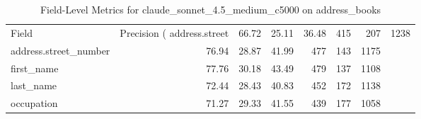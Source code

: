 \begin{table}
\caption{Field-Level Metrics for claude_sonnet_4.5_medium_c5000 on address_books}
\label{tab:fields_claude_sonnet_4.5_medium_c5000_address_books}
\begin{tabular}{lrrrrrr}
\toprule
Field & Precision (%
\midrule
address.street & 66.72 & 25.11 & 36.48 & 415 & 207 & 1238 \\
address.street_number & 76.94 & 28.87 & 41.99 & 477 & 143 & 1175 \\
first_name & 77.76 & 30.18 & 43.49 & 479 & 137 & 1108 \\
last_name & 72.44 & 28.43 & 40.83 & 452 & 172 & 1138 \\
occupation & 71.27 & 29.33 & 41.55 & 439 & 177 & 1058 \\
\bottomrule
\end{tabular}
\end{table}
